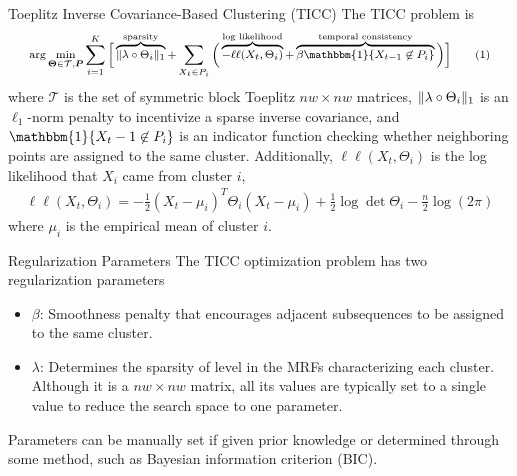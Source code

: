 \documentclass{beamer}
\DeclarePairedDelimiter \norm{\lVert}{\rVert}%
\begin{document}

\begin{frame}{Toeplitz Inverse Covariance-Based Clustering (TICC)}
	The TICC problem is
	\begin{align*}
		\footnotesize
		\arg\min\limits_{\boldsymbol{\Theta} \in \mathcal{T}, \boldsymbol{P}} \sum\limits_{i=1}^K\bigg[ \overbrace{\norm{\lambda \circ \Theta_i}_1}^{\text{sparsity}} + \sum\limits_{X_t \in P_i} \bigg( \overbrace{-\ell\ell(X_t, \Theta_i)}^{\text{log likelihood}} + \overbrace{\beta\mathbbm{1}\{X_{t-1} \not\in P_i \}}^{\text{temporal consistency}} \bigg) \bigg]
		\tag{1}
	\end{align*}
	where $\mathcal{T}$ is the set of symmetric block Toeplitz $nw \times nw$ matrices, $\norm{\lambda \circ \Theta_i}_1$ is an $\ell_1$-norm penalty to incentivize a sparse inverse covariance, and $\mathbbm{1}\{X_t-1 \not\in P_i\}$ is an indicator function checking whether neighboring points are assigned to the same cluster. Additionally, $\ell\ell(X_t, \Theta_i)$ is the log likelihood that $X_i$ came from cluster $i$,
	\begin{align*}
		\ell\ell(X_t, \Theta_i) = -\frac{1}{2}(X_t - \mu_i)^T \Theta_i(X_t - \mu_i) + \frac{1}{2}\log\det\Theta_i - \frac{n}{2}\log(2\pi) 
	\end{align*}
	where $\mu_i$ is the empirical mean of cluster $i$.
\end{frame}


\begin{frame}{Regularization Parameters}
	The TICC optimization problem has two regularization parameters
	\begin{itemize}
		\item $\beta$: Smoothness penalty that encourages adjacent subsequences to be assigned to the same cluster.
		\item $\lambda$: Determines the sparsity of level in the MRFs characterizing each cluster. Although it is a $nw \times nw$ matrix, all its values are typically set to a single value to reduce the search space to one parameter. 
	\end{itemize}
	Parameters can be manually set if given prior knowledge or determined through some method, such as Bayesian information criterion (BIC).
\end{frame}

\end{document}
